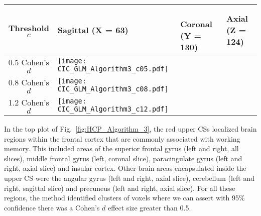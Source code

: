 \begin{table}[htbp]
\hspace*{-0.5cm}
\begin{adjustbox}{center}
\centering
    \begin{tabular}{cm{50mm}m{50mm}m{50mm}}
       \toprule
         Threshold $c$ & \hspace{1.4cm} Sagittal (X = 63) & \ \hspace{1.15cm} Coronal (Y = 130) & \hspace{1.0cm} Axial (Z = 124)\\
        \midrule
        0.5 Cohen's $d$ & \texttt{[image: CIC\_GLM\_Algorithm3\_c05.pdf]}\\
        0.8 Cohen's $d$ & \texttt{[image: CIC\_GLM\_Algorithm3\_c08.pdf]}\\
        1.2 Cohen's $d$ & \texttt{[image: CIC\_GLM\_Algorithm3\_c12.pdf]}\\
        \bottomrule
    \end{tabular}
\end{adjustbox}
    \label{fig:HCP_Algorithm_3_vs_GLM}
\end{table}

In the top plot of Fig.\ \ref{fig:HCP_Algorithm_3}, the red upper CSs localized brain regions within the frontal cortex that are commonly associated with working memory. This included areas of the superior frontal gyrus (left and right, all slices), middle frontal gyrus (left, coronal slice), paracingulate gyrus (left and right, axial slice) and insular cortex. Other brain areas encapsulated inside the upper CS were the angular gyrus (left and right, axial slice), cerebellum (left and right, sagittal slice) and precuneus (left and right, axial slice). For all these regions, the method identified clusters of voxels where we can assert with 95\% confidence there was a Cohen's $d$ effect size greater than 0.5.


